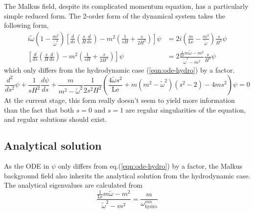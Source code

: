The Malkus field, despite its complicated momentum equation, has a particularly simple reduced form.
The 2-order form of the dynamical system takes the following form,
\begin{equation}
\begin{aligned}
    i\widetilde{\omega} \left(1 - \frac{m^2}{\widetilde{\omega}^2}\right) \left[\frac{d}{d s}\left(\frac{s}{H}\frac{d}{d s}\right) - m^2 \left(\frac{1}{sH} + \frac{s}{2H^3}\right)\right] \psi &= 2i \left(\frac{m}{\mathrm{Le}} - \frac{m^2}{\widetilde{\omega}}\right)\frac{s}{H^3} \psi \\ 
    \left[\frac{d}{d s}\left(\frac{s}{H}\frac{d}{d s}\right) - m^2 \left(\frac{1}{sH} + \frac{s}{2H^3}\right)\right] \psi &= 2 \frac{\frac{1}{\mathrm{Le}} m\widetilde{\omega} - m^2}{\widetilde{\omega}^2 - m^2}\frac{s}{H^3} \psi
\end{aligned}
\end{equation}
which only differs from the hydrodynamic case (\ref{eqn:ode-hydro}) by a factor. 
\[
    \frac{d^{2}}{d s^{2}} \psi + \frac{1}{sH^{2}} \frac{d\psi}{d s} + \frac{m}{m^2 - \widetilde{\omega}^2} \frac{1}{2s^2H^2} \left(\frac{4\widetilde{\omega}s^2}{\mathrm{Le}} + m(m^2 - \widetilde{\omega}^2)(s^2 -2) - 4ms^2\right) \psi = 0
\]
At the current stage, this form really doesn't seem to yield more information than the fact that both $s=0$ and $s=1$ are regular singularities of the equation, and regular solutions should exist.

\subsection{Analytical solution}
As the ODE in $\psi$ only differs from eq.(\ref{eqn:ode-hydro}) by a factor, the Malkus background field also inherits the analytical solution from the hydrodynamic case.
The analytical eigenvalues are calculated from
\[
    \frac{\frac{1}{\mathrm{Le}} m\widetilde{\omega} - m^2}{\widetilde{\omega}^2 - m^2} = \frac{m}{\omega_{\mathrm{hydro}}^{mn}}
\]

\clearpage

